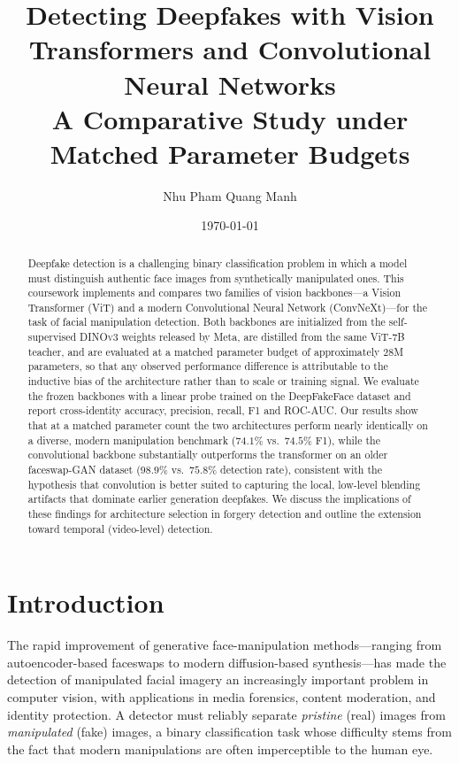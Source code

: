 \documentclass[11pt,a4paper]{article}
\title{\textbf{Detecting Deepfakes with Vision Transformers and Convolutional Neural Networks}\\
\large A Comparative Study under Matched Parameter Budgets}
\author{Nhu Pham Quang Manh}
\date{\today}
\begin{document}
\maketitle

\begin{abstract}
Deepfake detection is a challenging binary classification problem in which a model must
distinguish authentic face images from synthetically manipulated ones. This coursework
implements and compares two families of vision backbones---a Vision Transformer (ViT)
and a modern Convolutional Neural Network (ConvNeXt)---for the task of facial manipulation
detection. Both backbones are initialized from the self-supervised \textsc{DINOv3} weights
released by Meta, are distilled from the same ViT-7B teacher, and are evaluated at a matched
parameter budget of approximately $28$M parameters, so that any observed performance
difference is attributable to the inductive bias of the architecture rather than to scale or
training signal. We evaluate the frozen backbones with a linear probe trained on the
DeepFakeFace dataset and report cross-identity accuracy, precision, recall, F1 and ROC-AUC.
Our results show that at a matched parameter count the two architectures perform nearly
identically on a diverse, modern manipulation benchmark ($74.1\%$ vs.\ $74.5\%$ F1), while
the convolutional backbone substantially outperforms the transformer on an older
faceswap-GAN dataset ($98.9\%$ vs.\ $75.8\%$ detection rate), consistent with the hypothesis
that convolution is better suited to capturing the local, low-level blending artifacts that
dominate earlier generation deepfakes. We discuss the implications of these findings for
architecture selection in forgery detection and outline the extension toward temporal
(video-level) detection.
\end{abstract}

\tableofcontents

\section{Introduction}
The rapid improvement of generative face-manipulation methods---ranging from autoencoder-based
faceswaps to modern diffusion-based synthesis---has made the detection of manipulated facial
imagery an increasingly important problem in computer vision, with applications in media
forensics, content moderation, and identity protection. A detector must reliably separate
\emph{pristine} (real) images from \emph{manipulated} (fake) images, a binary classification
task whose difficulty stems from the fact that modern manipulations are often imperceptible to
the human eye.
\end{document}

